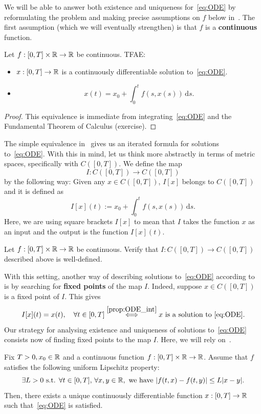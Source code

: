 We will be able to answer both existence and uniqueness for~\eqref{eq:ODE} by reformulating the problem and making precise assumptions on $f$ below in~. The first assumption (which we will eventually strengthen) is that $f$ is a \textbf{continuous} function. 
\begin{prop}
	\label{prop:ODE_int}
	Let $f:[0,T]\times\mathbb{R}\to\mathbb{R}$ be continuous. TFAE:
	\begin{itemize}
		\item $x:[0,T]\to \mathbb{R}$ is a continuously differentiable solution to~\eqref{eq:ODE}.
		\item \[
		x(t) = x_0 + \int_0^t f(s,x(s))\,\mathrm{d}s.
		\]
	\end{itemize}
\end{prop}
\begin{proof}
	This equivalence is immediate from integrating~\eqref{eq:ODE} and the Fundamental Theorem of Calculus (exercise).
\end{proof}
The simple equivalence in~ gives us an iterated formula for solutions to~\eqref{eq:ODE}. With this in mind, let us think more abstractly in terms of metric spaces, specifically with $C([0,T])$. We define the map
\[
I:C([0,T])\to C([0,T])
\]
by the following way: Given any $x\in C([0,T])$, $I[x]$ belongs to $C([0,T])$ and it is defined as
\[
I[x](t):= x_0 + \int_0^tf(s,x(s))\,\mathrm{d}s.
\]
Here, we are using square brackets $I[x]$ to mean that $I$ takes the function $x$ as an input and the output is the function $I[x](t)$.
\begin{ex}
	Let $f:[0,T]\times \mathbb{R}\to\mathbb{R}$ be continuous. Verify that $I:C([0,T])\to C([0,T])$ described above is well-defined.
\end{ex}
With this setting, another way of describing solutions to~\eqref{eq:ODE} according to~ is by searching for \textbf{fixed points} of the map $I$. Indeed, suppose $x\in C([0,T])$ is a fixed point of $I$. This gives
\[
I[x](t) = x(t),\quad\forall t\in[0,T]\overset{\Cref{prop:ODE_int}}{\iff} x\text{ is a solution to~\eqref{eq:ODE}.}
\]
Our strategy for analysing existence and uniqueness of solutions to~\eqref{eq:ODE} consists now of finding fixed points to the map $I$. Here, we will rely on~.
\begin{thm}
	\label{thm:Picard}
	Fix $T>0, x_0\in\mathbb{R}$ and a continuous function $f:[0,T]\times\mathbb{R}\to \mathbb{R}$. Assume that $f$ satisfies the following uniform Lipschitz property:
	\[
	\exists L> 0\text{ s.t. }\forall t\in[0,T],\,\forall x,y\in \mathbb{R},\text{ we have }|f(t,x)-f(t,y)|\le L|x-y|.
	\]
	Then, there exists a unique continuously differentiable function $x:[0,T]\to \mathbb{R}$ such that~\eqref{eq:ODE} is satisfied.
\end{thm}
